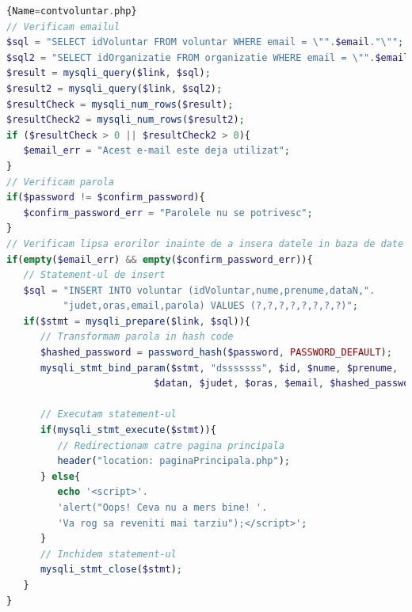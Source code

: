 \documentclass[12pt,a4paper]{report}
\begin{document}
\begin{lstlisting}[basicstyle=\small, language=PHP]{Name=contvoluntar.php}
// Verificam emailul
$sql = "SELECT idVoluntar FROM voluntar WHERE email = \"".$email."\"";
$sql2 = "SELECT idOrganizatie FROM organizatie WHERE email = \"".$email."\"";
$result = mysqli_query($link, $sql);
$result2 = mysqli_query($link, $sql2);
$resultCheck = mysqli_num_rows($result);
$resultCheck2 = mysqli_num_rows($result2);
if ($resultCheck > 0 || $resultCheck2 > 0){
   $email_err = "Acest e-mail este deja utilizat";
}
// Verificam parola
if($password != $confirm_password){
   $confirm_password_err = "Parolele nu se potrivesc";
}
// Verificam lipsa erorilor inainte de a insera datele in baza de date
if(empty($email_err) && empty($confirm_password_err)){
   // Statement-ul de insert
   $sql = "INSERT INTO voluntar (idVoluntar,nume,prenume,dataN,".
          "judet,oras,email,parola) VALUES (?,?,?,?,?,?,?,?)";
   if($stmt = mysqli_prepare($link, $sql)){
      // Transformam parola in hash code
      $hashed_password = password_hash($password, PASSWORD_DEFAULT); 
      mysqli_stmt_bind_param($stmt, "dsssssss", $id, $nume, $prenume,
                          $datan, $judet, $oras, $email, $hashed_password);

      // Executam statement-ul
      if(mysqli_stmt_execute($stmt)){
         // Redirectionam catre pagina principala
         header("location: paginaPrincipala.php");
      } else{
         echo '<script>'.
         'alert("Oops! Ceva nu a mers bine! '.
         'Va rog sa reveniti mai tarziu");</script>';
      }
      // Inchidem statement-ul
      mysqli_stmt_close($stmt);
   }
}
\end{lstlisting}
\end{document}
